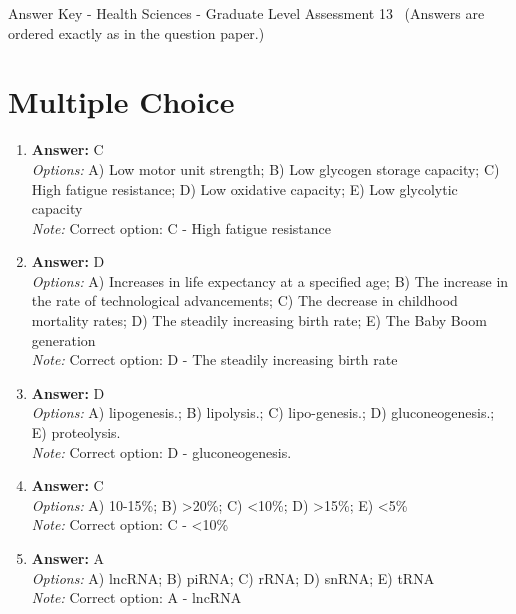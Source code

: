 \documentclass[12pt]{article}
\begin{document}
\begin{center}
Answer Key - Health Sciences - Graduate Level Assessment 13 \
\small (Answers are ordered exactly as in the question paper.)
\end{center}

\section*{Multiple Choice}
\begin{enumerate}[label=\arabic*.]
\item \textbf{Answer:} C
\\ \textit{Options:} A) Low motor unit strength; B) Low glycogen storage capacity; C) High fatigue resistance; D) Low oxidative capacity; E) Low glycolytic capacity
\\ \textit{Note:} Correct option: C - High fatigue resistance
\item \textbf{Answer:} D
\\ \textit{Options:} A) Increases in life expectancy at a specified age; B) The increase in the rate of technological advancements; C) The decrease in childhood mortality rates; D) The steadily increasing birth rate; E) The Baby Boom generation
\\ \textit{Note:} Correct option: D - The steadily increasing birth rate
\item \textbf{Answer:} D
\\ \textit{Options:} A) lipogenesis.; B) lipolysis.; C) lipo-genesis.; D) gluconeogenesis.; E) proteolysis.
\\ \textit{Note:} Correct option: D - gluconeogenesis.
\item \textbf{Answer:} C
\\ \textit{Options:} A) 10-15\%; B) \textgreater{}20\%; C) \textless{}10\%; D) \textgreater{}15\%; E) \textless{}5\%
\\ \textit{Note:} Correct option: C - \textless{}10\%
\item \textbf{Answer:} A
\\ \textit{Options:} A) lncRNA; B) piRNA; C) rRNA; D) snRNA; E) tRNA
\\ \textit{Note:} Correct option: A - lncRNA
\end{enumerate}
\end{document}
